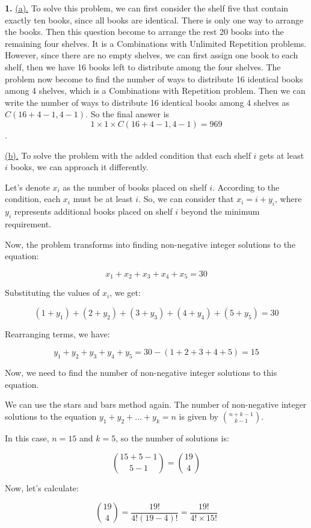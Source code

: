 \documentclass{article}
\begin{document}
\textbf{1.}
\underline{(a).}
To solve this problem, we can first consider the shelf five that contain exactly ten books, since all books are identical.  
There is only one way to arrange the books. Then this question become to arrange the rest 20 books into the remaining four shelves.
It is a Combinations with Unlimited Repetition problems. However, since there are no empty shelves, we can first assign one book to each shelf, then we have 16 books left to distribute among the four shelves.
The problem now become to find the number of ways to distribute 16 identical books among 4 shelves, which is a Combinations with Repetition problem.
Then we can write the number of ways to distribute 16 identical books among 4 shelves as $C(16+4-1, 4-1)$.
So the final answer is \[1 \times 1 \times C(16+4-1, 4-1) = 969\].

\underline{(b).}
To solve the problem with the added condition that each shelf \(i\) gets at least \(i\) books, we can approach it differently.

Let's denote \(x_i\) as the number of books placed on shelf \(i\). According to the condition, each \(x_i\) must be at least \(i\). So, we can consider that \(x_i = i + y_i\), where \(y_i\) represents additional books placed on shelf \(i\) beyond the minimum requirement. 

Now, the problem transforms into finding non-negative integer solutions to the equation:

\[x_1 + x_2 + x_3 + x_4 + x_5 = 30\]

Substituting the values of \(x_i\), we get:

\[(1+y_1) + (2+y_2) + (3+y_3) + (4+y_4) + (5+y_5) = 30\]

Rearranging terms, we have:

\[y_1 + y_2 + y_3 + y_4 + y_5 = 30 - (1 + 2 + 3 + 4 + 5) = 15\]

Now, we need to find the number of non-negative integer solutions to this equation.

We can use the stars and bars method again. The number of non-negative integer solutions to the equation \(y_1 + y_2 + \ldots + y_k = n\) is given by \(\binom{n+k-1}{k-1}\).

In this case, \(n = 15\) and \(k = 5\), so the number of solutions is:

\[\binom{15+5-1}{5-1} = \binom{19}{4}\]

Now, let's calculate:

\[\binom{19}{4} = \frac{19!}{4!(19-4)!} = \frac{19!}{4! \times 15!}\]
\end{document}
